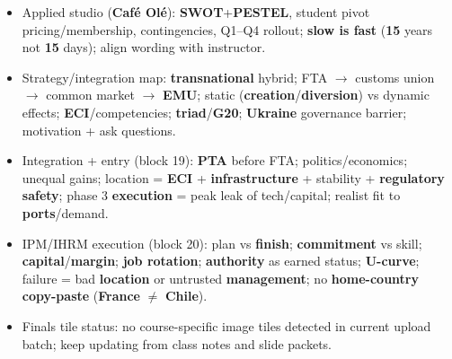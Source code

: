 \documentclass[10pt,a4paper]{article}
\begin{document}
\begin{itemize}
  \item Applied studio (\textbf{Caf\'e Ol\'e}): \textbf{SWOT}+\textbf{PESTEL}, student pivot pricing/membership, contingencies, Q1--Q4 rollout; \textbf{slow is fast} (\textbf{15} years not \textbf{15} days); align wording with instructor.
  \item Strategy/integration map: \textbf{transnational} hybrid; FTA $\rightarrow$ customs union $\rightarrow$ common market $\rightarrow$ \textbf{EMU}; static (\textbf{creation}/\textbf{diversion}) vs dynamic effects; \textbf{ECI}/competencies; \textbf{triad}/\textbf{G20}; \textbf{Ukraine} governance barrier; motivation + ask questions.
  \item Integration + entry (block 19): \textbf{PTA} before FTA; politics/economics; unequal gains; location = \textbf{ECI} + \textbf{infrastructure} + stability + \textbf{regulatory safety}; phase 3 \textbf{execution} = peak leak of tech/capital; realist fit to \textbf{ports}/demand.
  \item IPM/IHRM execution (block 20): plan vs \textbf{finish}; \textbf{commitment} vs skill; \textbf{capital}/\textbf{margin}; \textbf{job rotation}; \textbf{authority} as earned status; \textbf{U-curve}; failure = bad \textbf{location} or untrusted \textbf{management}; no \textbf{home-country copy-paste} (\textbf{France} $\neq$ \textbf{Chile}).
  \item Finals tile status: no course-specific image tiles detected in current upload batch; keep updating from class notes and slide packets.
\end{itemize}
\end{document}
